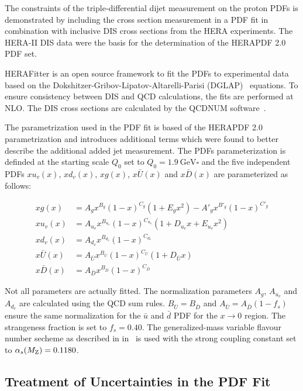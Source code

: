 The constraints of the triple-differential dijet measurement on the proton PDFs
is demonstrated by including the cross section measurement in a PDF fit in
combination with inclusive DIS cross sections from the HERA experiments. The
HERA-II DIS data were the basis for the determination of the HERAPDF 2.0 PDF
set.

HERAFitter is an open source framework to fit the PDFs to experimental data
based on the Dokshitzer-Gribov-Lipatov-Altarelli-Parisi
(DGLAP)~\cite{Gribov:1972ri,Altarelli:1977zs,Dokshitzer:1977sg} equations. To
ensure consistency between DIS and QCD calculations, the fits are performed at
NLO. The DIS cross sections are calculated by the QCDNUM
software~\cite{Botje:2010ay}.

The parametrization used in the PDF fit is based of the HERAPDF 2.0
parametrization and introduces additional terms which were found to better
describe the additional added jet measurement. The PDFs parameterization is
definded at the starting scale $Q_0$ set to $Q_0 = \SI{1.9}{\GeV \square}$ and
the five independent PDFs $xu_v(x)$, $xd_v(x)$, $xg(x)$, $x\bar{U}(x)$ and
$x\bar{D}(x)$ are parameterized as follows:

\begin{align}
  xg(x) &= A_g x^{B_g} (1-x)^{C_g} (1 + E_g x^2) - A'_g x^{B'_g} (1-x)^{C'_g} \\
  xu_v(x) &= A_{u_{v}} x^{B_{u_{v}}} (1-x)^{C_{u_{v}}}(1 + D_{u_{v}}x + E_{u_{v}}x^2)\\
  xd_v(x) &= A_{d_v} x^{B_{d_v}} (1-x)^{C_{d_{v}}}\\
  x\bar U(x) &= A_{\bar U} x^{B_{\bar U}} (1-x)^{C_{\bar U}}(1 + D_{\bar U}x)\\
  x\bar D(x) &= A_{\bar D} x^{B_{\bar D}} (1-x)^{C_{\bar D}}
\end{align}

Not all parameters are actually fitted. The normalization parameters $A_g$,
$A_{u_{v}}$ and $A_{d_{v}}$ are calculated using the QCD sum rules. $B_{\bar
U}=B_{\bar D}$ and $A_{\bar U} = A_{\bar D}(1-f_s)$ ensure the same
normalization for the $\bar u$ and $\bar d$ PDF for the $x \rightarrow 0$
region. The strangeness fraction is set to $f_s = 0.40$. The generalized-mass
variable flavour number secheme as described in
in~\cite{Thorne:1997ga,Thorne:2006qt} is used with the strong coupling constant
set to $\alpha_{s}(M_\mathrm{Z})= 0.1180$.


\subsection{Treatment of Uncertainties in the PDF Fit}
\label{section:treatment_pdf_uncertainties}

